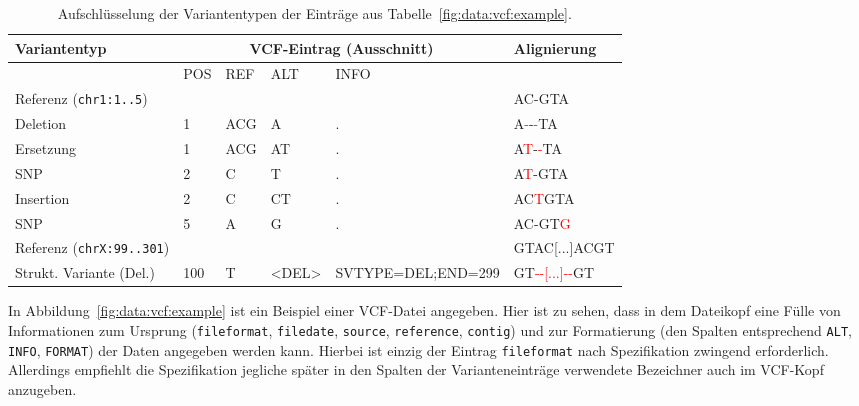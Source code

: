 \begin{table}[htbp]
    \begin{center}
    {\ttfamily\footnotesize
    \begin{tabular}{>{\rmfamily\normalsize}l|llll|l}
    Variantentyp & \multicolumn{4}{c|}{\rmfamily\normalsize VCF-Eintrag (Ausschnitt)} & {\rmfamily\normalsize Alignierung}\\
    \hline
    & POS & REF & ALT & INFO & \\
    \hline
    Referenz (\texttt{chr1:1..5})    &     &     &       &                    & AC-GTA\\
    Deletion                         &   1 & ACG & A     & .                  & A\textcolor{red}{-}-{}\textcolor{red}{-}TA\\
    Ersetzung                        &   1 & ACG & AT    & .                  & A\textcolor{red}{T}-{}\textcolor{red}{-}TA\\
    SNP                              &   2 & C   & T     & .                  & A\textcolor{red}{T}-GTA\\
    Insertion                        &   2 & C   & CT    & .                  & AC\textcolor{red}{T}GTA\\
    SNP                              &   5 & A   & G     & .                  & AC-GT\textcolor{red}{G}\\
    \hline
    Referenz (\texttt{chrX:99..301}) &     &     &       &                    & GTAC[...]ACGT\\
    Strukt. Variante (Del.)          & 100 & T   & <DEL> & SVTYPE=DEL;END=299 & GT\textcolor{red}{-{}-[...]-{}-}GT
    \end{tabular}
    }
    \end{center}
    \caption{Aufschlüsselung der Variantentypen der Einträge aus Tabelle~\ref{fig:data:vcf:example}.}
    \label{tab:data:vcf:example}
\end{table}
In Abbildung~\ref{fig:data:vcf:example} ist ein Beispiel einer VCF-Datei angegeben.
Hier ist zu sehen, dass in dem Dateikopf eine Fülle von Informationen zum Ursprung (\texttt{fileformat}, \texttt{filedate}, \texttt{source}, \texttt{reference}, \texttt{contig}) und zur Formatierung (den Spalten entsprechend \texttt{ALT}, \texttt{INFO}, \texttt{FORMAT}) der Daten angegeben werden kann.
Hierbei ist einzig der Eintrag \texttt{fileformat} nach Spezifikation zwingend erforderlich.
Allerdings empfiehlt die Spezifikation jegliche später in den Spalten der Varianteneinträge verwendete Bezeichner auch im VCF-Kopf anzugeben.

